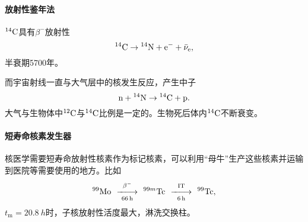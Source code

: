 \paragraph{放射性鉴年法}${^{14}\mathrm{C}}$具有$\beta^-$放射性
\[
	{^{14}\mathrm{C}}\to{^{14}\mathrm{N}}+\mathrm e^-+\bar\nu_\mathrm e,
\]
半衰期5700年。

而宇宙射线一直与大气层中的核发生反应，产生中子
\[
	\mathrm n+{^{14}\mathrm{N}}\to{^{14}\mathrm{C}}+\mathrm p.
\]
大气与生物体中${^{12}\mathrm{C}}$与${^{14}\mathrm{C}}$比例是一定的。生物死后体内${^{14}\mathrm{C}}$不断衰变。
\paragraph{短寿命核素发生器}
核医学需要短寿命放射性核素作为标记核素，可以利用“母牛”生产这些核素并运输到医院等需要使用的地方。比如
\[
	{^{99}\mathrm{Mo}}\enspace\mathop{-\hspace{-4pt}-\hspace{-5pt}\longrightarrow}\limits^{\beta^-}_{\SI{66}{h}}\enspace{^{99m}\mathrm{Tc}}\enspace\mathop{-\hspace{-4pt}-\hspace{-5pt}\longrightarrow}\limits^{\mathrm{IT}}_{\SI{6}{h}}\enspace{^{99}\mathrm{Tc}},
\]
$t_\mathrm m=\SI{20.8}{h}$时，子核放射性活度最大，淋洗交换柱。

